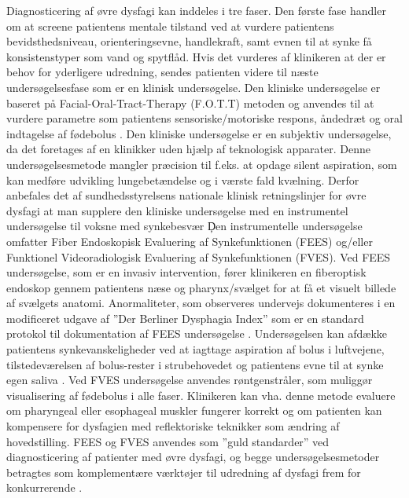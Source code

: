 \documentclass[main.tex]{subfiles}
\begin{document}
Diagnosticering af øvre dysfagi kan inddeles i tre faser. Den første fase handler om at screene patientens mentale tilstand ved at vurdere patientens bevidsthedsniveau, orienteringsevne, handlekraft, samt evnen til at synke få konsistenstyper som vand og spytflåd. Hvis det vurderes af klinikeren at der er behov for yderligere udredning, sendes patienten videre til næste undersøgelsesfase som er en klinisk undersøgelse. Den kliniske undersøgelse er baseret på Facial-Oral-Tract-Therapy (F.O.T.T) metoden og anvendes til at vurdere parametre som patientens sensoriske/motoriske respons, åndedræt og oral indtagelse af fødebolus \cite{Kjaersgaard2013PhDPerspective}. Den kliniske undersøgelse er en subjektiv undersøgelse, da det foretages af en klinikker uden hjælp af teknologisk apparater. Denne undersøgelsesmetode mangler præcision til f.eks. at opdage silent aspiration, som kan medføre udvikling lungebetændelse og i værste fald kvælning. Derfor anbefales det af sundhedsstyrelsens nationale klinisk retningslinjer for øvre dysfagi at man supplere den kliniske undersøgelse med en instrumentel undersøgelse til voksne med synkebesvær \c
Den instrumentelle undersøgelse omfatter Fiber Endoskopisk Evaluering af Synkefunktionen (FEES) og/eller Funktionel Videoradiologisk Evaluering af Synkefunktionen (FVES).  Ved FEES undersøgelse, som er en invasiv intervention, fører klinikeren en fiberoptisk endoskop gennem patientens næse og pharynx/svælget for at få et visuelt billede af svælgets anatomi. Anormaliteter, som observeres undervejs dokumenteres i en modificeret udgave af ”Der Berliner Dysphagia Index” som er en standard protokol til dokumentation af FEES undersøgelse . Undersøgelsen kan afdække patientens synkevanskeligheder ved at iagttage aspiration af bolus i luftvejene, tilstedeværelsen af bolus-rester i strubehovedet og patientens evne til at synke egen saliva . 
Ved FVES undersøgelse anvendes røntgenstråler, som muliggør visualisering af fødebolus i alle faser. Klinikeren kan vha. denne metode evaluere om pharyngeal eller esophageal muskler fungerer korrekt og om patienten kan kompensere for dysfagien med reflektoriske teknikker som ændring af hovedstilling. FEES og FVES anvendes som ”guld standarder” ved diagnosticering af patienter med øvre dysfagi, og begge undersøgelsesmetoder betragtes som komplementære værktøjer til udredning af dysfagi frem for konkurrerende .




\end{document}
